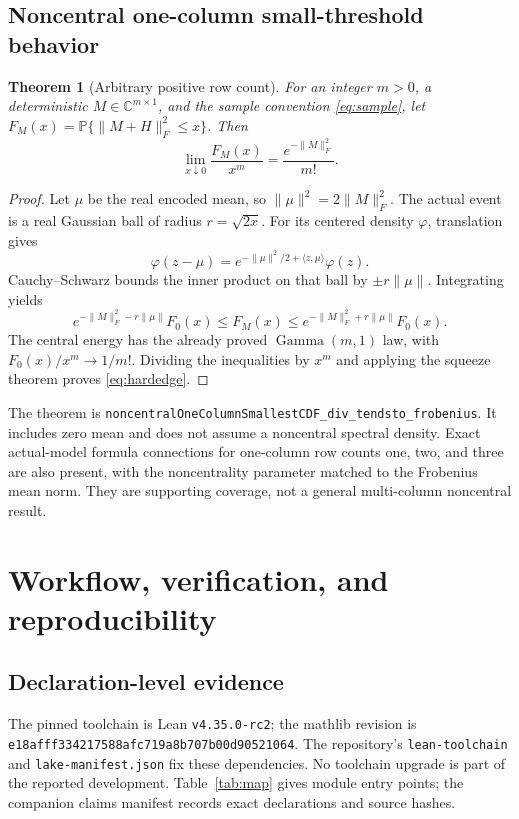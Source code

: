 \documentclass[11pt]{article}
\newtheorem{theorem}{Theorem}[section]
\newcommand{\C}{\mathbb C}
\newcommand{\Prob}{\mathbb P}
\newcommand{\lean}[1]{{\small\nolinkurl{#1}}}
\begin{document}
\subsection{Noncentral one-column small-threshold behavior}
\begin{theorem}[Arbitrary positive row count]\label{thm:onecolumn}
For an integer $m>0$, a deterministic $M\in\C^{m\times1}$, and the sample
convention \eqref{eq:sample}, let
$F_M(x)=\Prob\{\|M+H\|_F^2\leq x\}$. Then
\begin{equation}\label{eq:hardedge}
 \lim_{x\downarrow0}\frac{F_M(x)}{x^m}
       =\frac{e^{-\|M\|_F^2}}{m!}.
\end{equation}
\end{theorem}
\begin{proof}
Let $\mu$ be the real encoded mean, so $\|\mu\|^2=2\|M\|_F^2$.
The actual event is a real Gaussian ball of radius $r=\sqrt{2x}$.
For its centered density $\varphi$, translation gives
\[
 \varphi(z-\mu)=e^{-\|\mu\|^2/2+\langle z,\mu\rangle}\varphi(z).
\]
Cauchy--Schwarz bounds the inner product on that ball by
$\pm r\|\mu\|$. Integrating yields
\[
 e^{-\|M\|_F^2-r\|\mu\|}F_0(x)
 \leq F_M(x)\leq
 e^{-\|M\|_F^2+r\|\mu\|}F_0(x).
\]
The central energy has the already proved $\operatorname{Gamma}(m,1)$ law,
with $F_0(x)/x^m\to1/m!$. Dividing the inequalities by $x^m$ and applying
the squeeze theorem proves \eqref{eq:hardedge}.
\end{proof}
The theorem is
\lean{noncentralOneColumnSmallestCDF_div_tendsto_frobenius}.
It includes zero mean and does not assume a noncentral spectral density.
Exact actual-model formula connections for one-column row counts one, two,
and three are also present, with the noncentrality parameter matched to the
Frobenius mean norm. They are supporting coverage, not a general multi-column
noncentral result.

\section{Workflow, verification, and reproducibility}\label{sec:verification}
\subsection{Declaration-level evidence}
The pinned toolchain is Lean \lean{v4.35.0-rc2}; the mathlib revision is
\lean{e18afff334217588afc719a8b707b00d90521064}.
The repository's \lean{lean-toolchain} and \lean{lake-manifest.json} fix these
dependencies. No toolchain upgrade is part of the reported development.
Table~\ref{tab:map} gives module entry points; the companion claims manifest
records exact declarations and source hashes.
\end{document}
